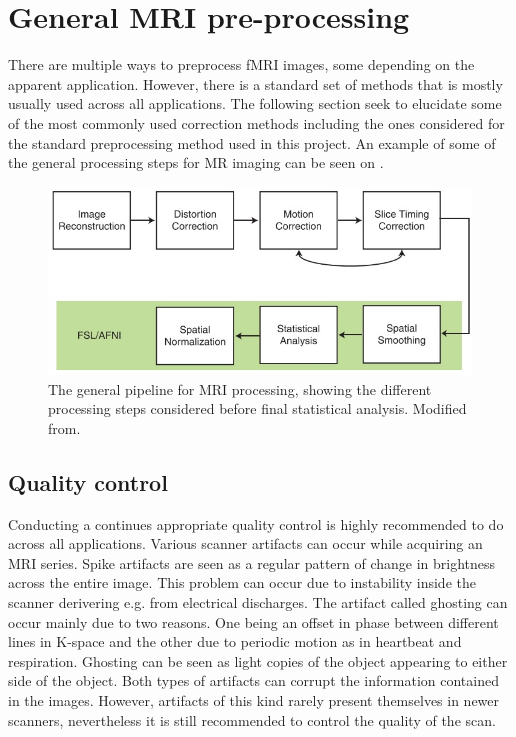 \section{General MRI pre-processing}
There are multiple ways to preprocess fMRI images, some depending on the apparent application. However, there is a standard set of methods that is mostly usually used across all applications. The following section seek to elucidate some of the most commonly used correction methods including the ones considered for the standard preprocessing method used in this project. An example of some of the general processing steps for MR imaging can be seen on .\cite{Poldrack2011} 

\begin{figure}[H]                 
	\includegraphics[width=.8\textwidth]{figures/aBackground/processing}  
	\caption{The general pipeline for MRI processing, showing the different processing steps considered before final statistical analysis. Modified from\cite{Poldrack}.}
	\label{fig:back:pipeline} 
\end{figure}


\subsection{Quality control}
Conducting a continues appropriate quality control is highly recommended to do across all applications. Various scanner artifacts can occur while acquiring an MRI series. Spike artifacts are seen as a regular pattern of change in brightness across the entire image. This problem can occur due to instability inside the scanner derivering e.g. from electrical discharges.  
The artifact called ghosting can occur mainly due to two reasons. One being an offset in phase between different lines in K-space and the other due to periodic motion as in heartbeat and respiration. Ghosting can be seen as light copies of the object appearing to either side of the object. Both types of artifacts can corrupt the information contained in the images. However, artifacts of this kind rarely present themselves in newer scanners, nevertheless it is still recommended to control the quality of the scan.\cite{Poldrack2011}

